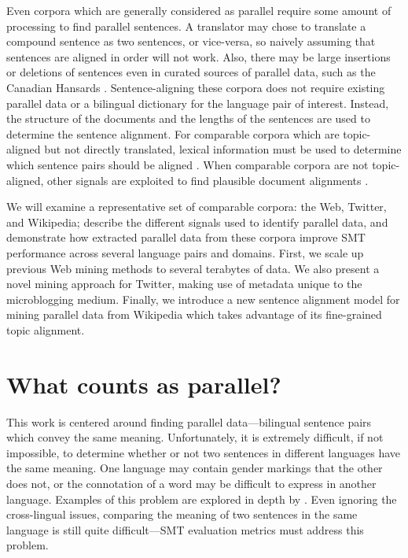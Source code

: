 Even corpora which are generally considered as parallel require some amount of
processing to find parallel sentences. 
A translator may chose to translate a compound sentence as two sentences, or
vice-versa, so naively assuming that sentences are aligned in order will not
work.
Also, there may be large insertions or deletions of sentences even in curated
sources of parallel data, such as the Canadian Hansards \citep{Gale93,Chen93}.
Sentence-aligning these corpora does not require existing parallel data or a
bilingual dictionary for the language pair of interest. Instead, the structure
of the documents and the lengths of the sentences are used to determine the
sentence alignment. For comparable corpora which are topic-aligned but not
directly translated, lexical information must be used to determine which
sentence pairs should be aligned \citep{Munteanu05}. When comparable corpora are
not topic-aligned, other signals are exploited to find plausible document
alignments \citep{Resnik03}.

We will examine a representative set of comparable corpora: the Web, Twitter,
and Wikipedia; describe the different signals used to identify parallel data,
and demonstrate how extracted parallel data from these corpora improve SMT
performance across several language pairs and domains. First, we scale up
previous Web mining methods \citep{Resnik03} to several terabytes of data. We
also present a novel mining approach for Twitter, making use of metadata unique
to the microblogging medium. Finally, we introduce a new sentence alignment
model for mining parallel data from Wikipedia which takes advantage of its
fine-grained topic alignment.

\section{What counts as parallel?}
This work is centered around finding parallel data---bilingual sentence pairs
which convey the same meaning. Unfortunately, it is extremely difficult, if not
impossible, to determine whether or not two sentences in different languages
have the same meaning. One language may contain gender markings that the other
does not, or the connotation of a word may be difficult to express in another
language. Examples of this problem are explored in depth by \citet{Kay97}. 
Even ignoring the cross-lingual issues, comparing the meaning of two sentences
in the same language is still quite difficult---SMT evaluation metrics
\citep{Papineni02,Banerjee05,Snover06} must address this problem.

